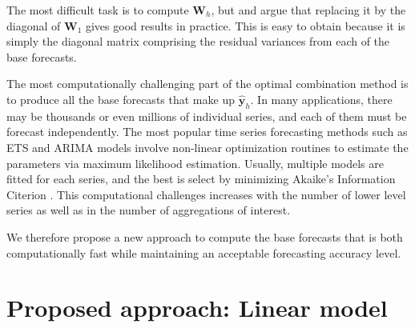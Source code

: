 \documentclass[11pt,a4paper,]{article}
\begin{document}
The most difficult task is to compute \(\bm{W}_h\), but \textcite{mint2018} and \textcite{hyndman2016fast} argue that replacing it by the diagonal of \(\bm{W}_1\) gives good results in practice. This is easy to obtain because it is simply the diagonal matrix comprising the residual variances from each of the base forecasts.

The most computationally challenging part of the optimal combination method is to produce all the base forecasts that make up \(\hat{\bm{y}}_h\). In many applications, there may be thousands or even millions of individual series, and each of them must be forecast independently. The most popular time series forecasting methods such as ETS and ARIMA models \autocite{fpp2} involve non-linear optimization routines to estimate the parameters via maximum likelihood estimation. Usually, multiple models are fitted for each series, and the best is select by minimizing Akaike's Information Citerion \autocite{akaike1998information}. This computational challenges increases with the number of lower level series as well as in the number of aggregations of interest.

We therefore propose a new approach to compute the base forecasts that is both computationally fast while maintaining an acceptable forecasting accuracy level.

\hypertarget{proposed-approach-linear-model}{%
\section{\texorpdfstring{Proposed approach: Linear model \label{sec:proposedapproach1}}{Proposed approach: Linear model }}\label{proposed-approach-linear-model}}
\end{document}
